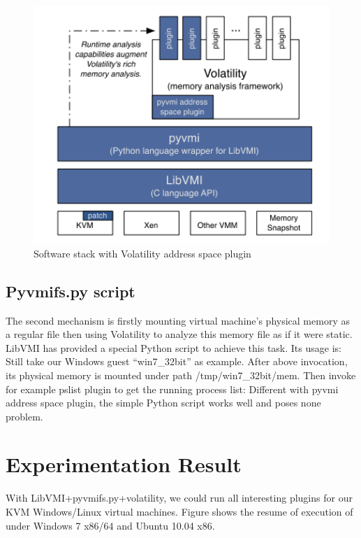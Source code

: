 \begin{figure}[htbp]
	\centering
		\includegraphics[width=14cm, height= 9cm ]{Figures/Figure30.png}
	\caption[Software stack with Volatility address space plugin]{Software stack with Volatility address space plugin}
	\label{fig:Software stack with Volatility address space plugin}
\end{figure}

\subsection{Pyvmifs.py script}
The second mechanism is firstly mounting virtual machine’s physical memory as a regular file then using Volatility to analyze this 
memory file as if it were static. LibVMI has provided a special Python script to achieve this task. Its usage is:
Still take our Windows guest “win7\_32bit” as example. After above invocation, its physical memory is mounted under path 
/tmp/win7\_32bit/mem. Then invoke for example pslist plugin to get the running process list:
Different with pyvmi address space plugin, the simple Python script works well and poses none problem.

\section{Experimentation Result}
With LibVMI+pyvmifs.py+volatility, we could run all interesting plugins for our KVM Windows/Linux virtual machines. 
Figure shows the resume of execution of under Windows 7 x86/64 and Ubuntu 10.04 x86.

